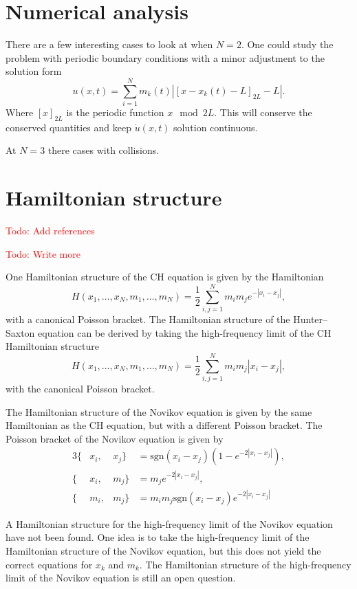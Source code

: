 \documentclass[english,master]{liumaiex}
\theoremstyle{plain}
\theoremstyle{definition}
\newcommand\todo[1]{\textcolor{red}{#1}}
\newcommand{\sgn}{\text{sgn}}
\begin{document}
\section{Numerical analysis} \label{sec:Numerical}

There are a few interesting cases to look at when $N = 2$. One could study the problem with periodic boundary conditions with a minor adjustment to the solution form
\begin{equation}
	u(x, t) = \sum_{i = 1}^{N} m_k(t) |[x - x_k(t) - L]_{2L} - L|.
\end{equation}
Where $[x]_{2L}$ is the periodic function $x \mod 2L$. This will conserve the conserved quantities and keep $\dot{u}(x,t)$ solution continuous.

At $N = 3$ there cases with collisions.


\section{Hamiltonian structure}
\todo{Todo: Add references}

\todo{Todo: Write more}

One Hamiltonian structure of the CH equation is given by the Hamiltonian
\begin{equation}
	H(x_1, \dots, x_N, m_1, \dots, m_N) = \frac{1}{2} \sum_{i,j = 1}^{N} m_i m_j e^{-|x_i - x_j|},
\end{equation}
with a canonical Poisson bracket. The Hamiltonian structure of the Hunter--Saxton equation can be derived by taking the high-frequency limit of the CH Hamiltonian structure
\begin{equation}
	H(x_1, \dots, x_N, m_1, \dots, m_N) = \frac{1}{2} \sum_{i,j = 1}^{N} m_i m_j |x_i - x_j|,
\end{equation}
with the canonical Poisson bracket.

The Hamiltonian structure of the Novikov equation is given by the same Hamiltonian as the CH equation, but with a different Poisson bracket. The Poisson bracket of the Novikov equation is given by
\begin{alignat}{3}
	\{&x_i, &x_j\} &= \sgn(x_i - x_j)(1 - e^{-2|x_i - x_j|}), \\
	\{&x_i, &m_j\} &= m_j e^{-2|x_i - x_j|}, \\
	\{&m_i, &m_j\} &= m_i m_j \sgn(x_i - x_j)e^{-2|x_i - x_j|}
\end{alignat}

A Hamiltonian structure for the high-frequency limit of the Novikov equation have not been found. One idea is to take the high-frequency limit of the Hamiltonian structure of the Novikov equation, but this does not yield the correct equations for $x_k$ and $m_k$. The Hamiltonian structure of the high-frequency limit of the Novikov equation is still an open question.
\end{document}
